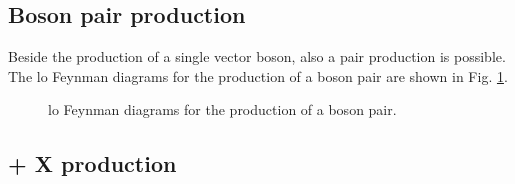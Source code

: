 \subsection{Boson pair production}

Beside the production of a single vector boson, also a pair production is possible.
The \gls{lo} Feynman diagrams for the production of a boson pair are shown in Fig. \ref{fig:dib_prod}.

\begin{figure}[h]
\centering 
{}
\caption{\gls{lo} Feynman diagrams for the production of a boson pair.}\label{fig:dib_prod}
\end{figure}


\subsection{\ttbar + X production}

